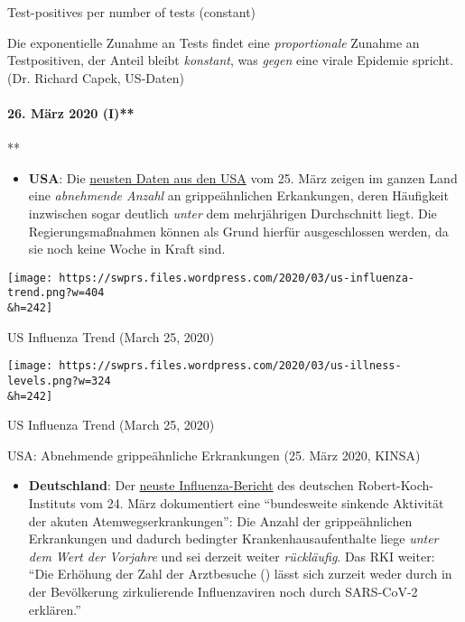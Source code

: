 Test-positives per number of tests (constant)

Die exponentielle Zunahme an Tests findet eine \emph{proportionale}
Zunahme an Testpositiven, der Anteil bleibt \emph{konstant}, was
\emph{gegen} eine virale Epidemie spricht. (Dr. Richard Capek, US-Daten)

\hypertarget{26-muxe4rz-2020-i}{%
\paragraph{26. März 2020 (I)**}\label{26-muxe4rz-2020-i}}

**

\begin{itemize}
\tightlist
\item
  \textbf{USA}: Die \href{https://healthweather.us/}{neusten Daten aus
  den USA} vom 25. März zeigen im ganzen Land eine \emph{abnehmende
  Anzahl} an grippeähnlichen Erkankungen, deren Häufigkeit inzwischen
  sogar deutlich \emph{unter} dem mehrjährigen Durchschnitt liegt. Die
  Regierungsmaßnahmen können als Grund hierfür ausgeschlossen werden, da
  sie noch keine Woche in Kraft sind.
\end{itemize}

\href{https://swprs.org/covid-19-hinweis-ii/us-influenza-trend/}{}

\texttt{[image: https://swprs.files.wordpress.com/2020/03/us-influenza-trend.png?w=404\\\&h=242]}

US Influenza Trend (March 25, 2020)

\href{https://swprs.org/covid-19-hinweis-ii/us-illness-levels/}{}

\texttt{[image: https://swprs.files.wordpress.com/2020/03/us-illness-levels.png?w=324\\\&h=242]}

US Influenza Trend (March 25, 2020)

USA: Abnehmende grippeähnliche Erkrankungen (25. März 2020, KINSA)

\begin{itemize}
\tightlist
\item
  \textbf{Deutschland}: Der
  \href{https://influenza.rki.de/Wochenberichte/2019_2020/2020-12.pdf}{neuste
  Influenza-Bericht} des deutschen Robert-Koch-Instituts vom 24. März
  dokumentiert eine ``bundesweite sinkende Aktivität der akuten
  Atemwegs­erkran­kungen'': Die Anzahl der grippeähnlichen Erkrankungen
  und dadurch bedingter Kranken­haus­aufenthalte liege \emph{unter dem
  Wert der Vorjahre} und sei derzeit weiter \emph{rückläufig}. Das RKI
  weiter: ``Die Erhöhung der Zahl der Arztbesuche () lässt sich zurzeit
  weder durch in der Bevölkerung zirkulierende Influenzaviren noch durch
  SARS-CoV-2 erklären.''\\
\end{itemize}


